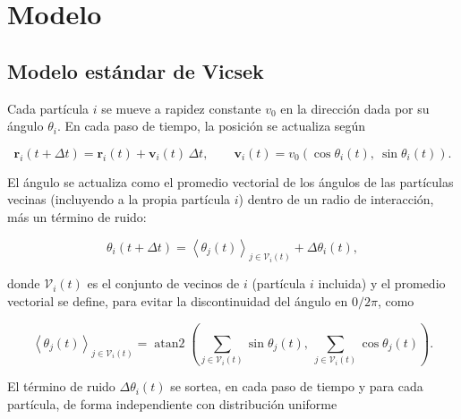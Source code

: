 \documentclass[a4paper,11pt]{article}
\begin{document}
\section{Modelo}
\label{sec:modelo}


\subsection{Modelo estándar de Vicsek}
\label{sec:modelo-estandar}

Cada partícula $i$ se mueve a rapidez constante $v_0$ en la dirección dada
por su ángulo $\theta_i$. En cada paso de tiempo, la posición se actualiza
según

\begin{equation}
  \bm{r}_i(t+\Delta t) = \bm{r}_i(t) + \bm{v}_i(t)\,\Delta t,
  \qquad
  \bm{v}_i(t) = v_0\left(\cos\theta_i(t),\ \sin\theta_i(t)\right).
  \label{eq:vicsek-posicion}
\end{equation}

El ángulo se actualiza como el promedio vectorial de los ángulos de las
partículas vecinas (incluyendo a la propia partícula $i$) dentro de un radio
de interacción, más un término de ruido:

\begin{equation}
  \theta_i(t+\Delta t) = \left\langle \theta_j(t) \right\rangle_{j \in \mathcal{V}_i(t)} + \Delta\theta_i(t),
  \label{eq:vicsek-angulo}
\end{equation}

donde $\mathcal{V}_i(t)$ es el conjunto de vecinos de $i$ (partícula $i$
incluida) y el promedio vectorial se define, para evitar la discontinuidad
del ángulo en $0/2\pi$, como

\begin{equation}
  \left\langle \theta_j(t) \right\rangle_{j \in \mathcal{V}_i(t)}
  = \operatorname{atan2}\!\left(\sum_{j \in \mathcal{V}_i(t)} \sin\theta_j(t),\ \sum_{j \in \mathcal{V}_i(t)} \cos\theta_j(t)\right).
  \label{eq:vicsek-promedio-vectorial}
\end{equation}

El término de ruido $\Delta\theta_i(t)$ se sortea, en cada paso de tiempo y
para cada partícula, de forma independiente con distribución uniforme
\end{document}
